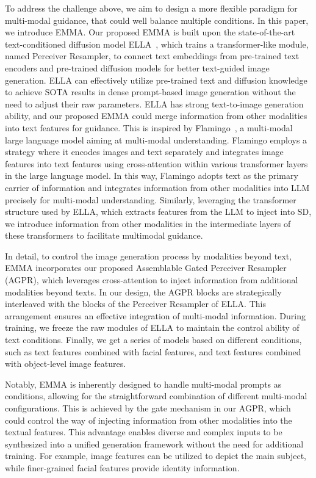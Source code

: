 To address the challenge above, we aim to design a more flexible paradigm for multi-modal guidance, that could well balance multiple conditions. 
In this paper, we introduce EMMA. Our proposed EMMA is built upon the state-of-the-art text-conditioned diffusion model ELLA~\cite{hu2024ella}, which trains a transformer-like module, named Perceiver Resampler, to connect text embeddings from pre-trained text encoders and pre-trained diffusion models for better text-guided image generation.
ELLA can effectively utilize pre-trained text and diffusion knowledge to achieve SOTA results in dense prompt-based image generation without the need to adjust their raw parameters. 
ELLA has strong text-to-image generation ability, and our proposed EMMA could merge information from other modalities into text features for guidance. This is inspired by Flamingo~\cite{alayrac2022flamingo}, a multi-modal large language model aiming at multi-modal understanding. Flamingo employs a strategy where it encodes images and text separately and integrates image features into text features using cross-attention within various transformer layers in the large language model. In this way, Flamingo adopts text as the primary carrier of information and integrates information from other modalities into LLM precisely for multi-modal understanding. 
Similarly, leveraging the transformer structure used by ELLA, which extracts features from the LLM to inject into SD, we introduce information from other modalities in the intermediate layers of these transformers to facilitate multimodal guidance.


In detail, to control the image generation process by modalities beyond text, EMMA incorporates our proposed Assemblable Gated Perceiver Resampler (AGPR), which leverages cross-attention to inject information from additional modalities beyond texts. In our design, the AGPR blocks are strategically interleaved with the blocks of the Perceiver Resampler of ELLA. This arrangement ensures an effective integration of multi-modal information. 
During training, we freeze the raw modules of ELLA to maintain the control ability of text conditions. Finally, we get a series of models based on different conditions, such as text features combined with facial features, and text features combined with object-level image features. 

Notably, EMMA is inherently designed to handle multi-modal prompts as conditions, allowing for the straightforward combination of different multi-modal configurations. This is achieved by the gate mechanism in our AGPR, which could control the way of injecting information from other modalities into the textual features. This advantage enables diverse and complex inputs to be synthesized into a unified generation framework without the need for additional training.
For example, image features can be utilized to depict the main subject, while finer-grained facial features provide identity information. 

